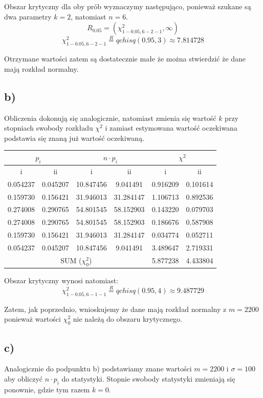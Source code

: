 \documentclass{article}
\begin{document}
Obszar krytyczny dla oby prób wyznaczymy następująco, ponieważ szukane są dwa parametry $k = 2$, natomiast $n =6$.
\[ R_{0.05} = (\chi^2_{1-0.05,6-2-1}, \infty) \]
\[ \chi^2_{1-0.05,6-2-1} \overset{R}{=} qchisq(0.95, 3) \approx 7.814728 \]

Otrzymane wartości zatem są dostatecznie małe że można stwierdzić że dane mają rozkład normalny.

\subsection{b)}
Obliczenia dokonują się analogicznie, natomiast zmienia się wartość $k$ przy stopniach swobody rozkładu $\chi^2$ i zamiast estymowana wartość oczekiwana podstawia się znaną już wartość oczekiwaną.

\begin{center} \begin{tabular}{|c|c|c|c|c|c|} \hline
\multicolumn{2}{|c|}{$p_i$} & \multicolumn{2}{|c|}{$n \cdot p_i$} & \multicolumn{2}{|c|}{$\chi^2$} \\ \hline
i & ii & i & ii & i & ii \\ \hline
0.054237 & 0.045207 & 10.847456 & 9.041491 & 0.916209 & 0.101614 \\ \hline
0.159730 & 0.156421 & 31.946013 & 31.284147 & 1.106713 & 0.892536 \\ \hline
0.274008 & 0.290765 & 54.801545 & 58.152903 & 0.143220 & 0.079703 \\ \hline
0.274008 & 0.290765 & 54.801545 & 58.152903 & 0.186676 & 0.587908 \\ \hline
0.159730 & 0.156421 & 31.946013 & 31.284147 & 0.034774 & 0.052711 \\ \hline
0.054237 & 0.045207 & 10.847456 & 9.041491 & 3.489647 & 2.719331 \\ \hline				
\multicolumn{4}{|c|}{SUM ($\chi^2_0$)} & 5.877238 & 4.433804 \\ \hline
\end{tabular} \end{center}

Obszar krytyczny wynosi natomiast:
\[ \chi^2_{1-0.05,6-1-1} \overset{R}{=} qchisq(0.95, 4) \approx 9.487729 \]

Zatem, jak poprzednio, wnioskujemy że dane mają rozkład normalny z $m = 2200$ ponieważ wartości $\chi^2_0$ nie należą do obszaru krytycznego.

\subsection{c)}
Analogicznie do podpunktu b) podstawiamy znane wartości $m = 2200$ i $\sigma = 100$ aby obliczyć $n \cdot p_i$ do statystyki. Stopnie swobody statystyki zmieniają się ponownie, gdzie tym razem $k=0$.
\end{document}
